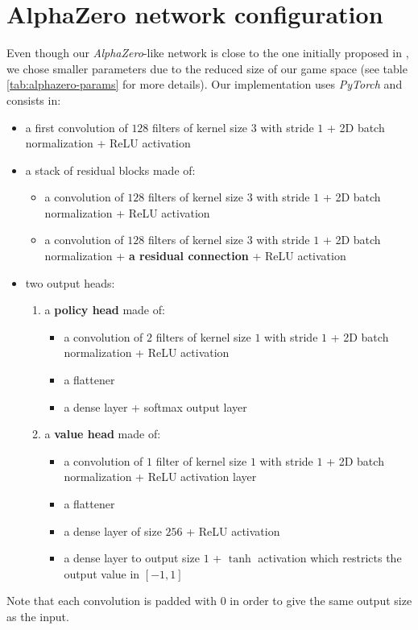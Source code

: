 \documentclass[journal, a4paper]{IEEEtran}
\begin{document}
\section*{AlphaZero network configuration}
\label{sec:alphazero-network}
Even though our \textit{AlphaZero}-like network is close to the one initially proposed in \cite{alphagozero}, we chose smaller parameters due to the reduced size of our game space (see table \ref{tab:alphazero-params} for more details). Our implementation uses \textit{PyTorch}\cite{pytorch} and consists in:
\begin{itemize}
    \item a first convolution of $128$ filters of kernel size $3$ with stride $1$ + 2D batch normalization + ReLU activation
    \item a stack of residual blocks made of:
    \begin{itemize}
        \item a convolution of $128$ filters of kernel size $3$ with stride $1$ + 2D batch normalization + ReLU activation
        \item a convolution of $128$ filters of kernel size $3$ with stride $1$ + 2D batch normalization + \textbf{a residual connection} + ReLU activation
    \end{itemize}
    \item two output heads:
    \begin{enumerate}
        \item a \textbf{policy head} made of:
            \begin{itemize}
                \item a convolution of $2$ filters of kernel size $1$ with stride $1$ + 2D batch normalization + ReLU activation
                \item a flattener
                \item a dense layer + softmax output layer
            \end{itemize}
        \item a \textbf{value head} made of:
            \begin{itemize}
                \item a convolution of $1$ filter of kernel size $1$ with stride $1$ + 2D batch normalization + ReLU activation layer
                \item a flattener
                \item a dense layer of size $256$ + ReLU activation
                \item a dense layer to output size $1$ + $\tanh$ activation which restricts the output value in $[-1,1]$
            \end{itemize}
    \end{enumerate}
\end{itemize}
Note that each convolution is padded with 0 in order to give the same output size as the input.
\end{document}
